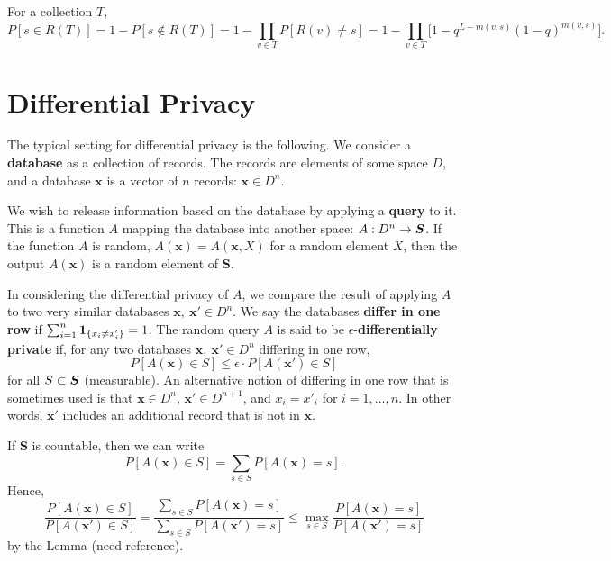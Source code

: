 \documentclass[11pt,draft]{article}
\begin{document}
For a collection $T$,
\[ 
    P[s \in R(T)] = 1-P[s \not\in R(T)] = 1-\prod_{v \in T} P[R(v) \neq s]
    = 1-\prod_{v \in T} \big[1 - q^{L-m(v,s)}(1-q)^{m(v,s)} \big].
\]

\section{Differential Privacy}

The typical setting for differential privacy is the following. 
We consider a \textbf{database} as a collection of records. 
The records are elements of some space $D$, and a database $\boldsymbol{x}$
is a vector of $n$ records: $\boldsymbol{x} \in D^n$. 

We wish to release information based on the database by applying a 
\textbf{query} to it. 
This is a function $A$ mapping the database into another space: 
$A:D^n\rightarrow \boldsymbol{S}$. 
If the function $A$ is random, \ie $A(\boldsymbol{x}) = A(\boldsymbol{x}, X)$
for a random element $X$, then the output $A(\boldsymbol{x})$ is a random 
element of $\boldsymbol{S}$.

In considering the differential privacy of $A$, we compare the result of 
applying $A$ to two very similar databases $\boldsymbol{x},\ \boldsymbol{x'} 
\in D^n$.
We say the databases \textbf{differ in one row} if 
$\sum_{i=1}^n \operatorname{\mathbf{1}}_{\{x_i \neq x'_i\}} = 1$.
The random query $A$ is said to be $\epsilon$-\textbf{differentially private} if,
for any two databases $\boldsymbol{x},\ \boldsymbol{x'} \in D^n$ differing in
one row,
\[ P[A(\boldsymbol{x}) \in S] \leq \epsilon \cdot P[A(\boldsymbol{x'}) \in S] \]
for all $S \subset \boldsymbol{S}$ (measurable).
An alternative notion of differing in one row that is sometimes used is that
$\boldsymbol{x} \in D^n$, $\boldsymbol{x'} \in D^{n+1}$, and $x_i = x'_i$ for 
$i = 1,\dots,n$. 
In other words, $\boldsymbol{x'}$ includes an additional record that is not
in $\boldsymbol{x}$.

If $\boldsymbol{S}$ is countable, then we can write 
\[ P[A(\boldsymbol{x}) \in S] = \sum_{s \in S} P[A(\boldsymbol{x}) = s]. \]
Hence, 
\[ \frac{P[A(\boldsymbol{x}) \in S]}{P[A(\boldsymbol{x'}) \in S]} = 
    \frac{\sum_{s \in S} P[A(\boldsymbol{x}) = s]}
    {\sum_{s \in S} P[A(\boldsymbol{x'}) = s]} \leq
\max_{s \in S} \frac{P[A(\boldsymbol{x}) = s]}{P[A(\boldsymbol{x'}) = s]} \]
by the Lemma (need reference).
\end{document}
